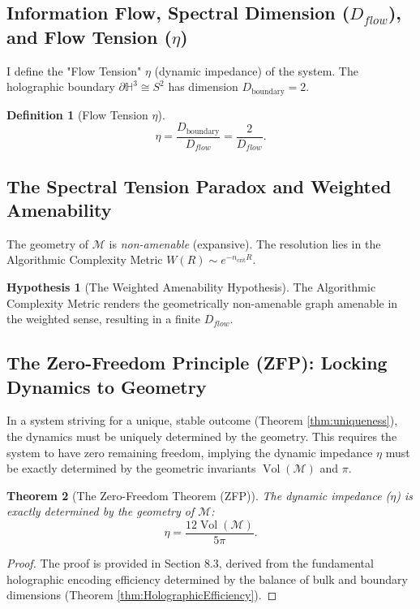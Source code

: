\documentclass[11pt, a4paper]{article}
\newtheorem{theorem}{Theorem}[section]
\theoremstyle{definition}
\newtheorem{definition}[theorem]{Definition}
\newtheorem{hypothesis}{Hypothesis}
\theoremstyle{definition}
\newcommand{\HH}{\mathbb{H}^3}
\newcommand{\M}{\mathcal{M}}
\newcommand{\Vol}{\operatorname{Vol}}
\newcommand{\Veight}{\Vol(\M)}
\newcommand{\ncrit}{n_{\mathrm{crit}}}
\newcommand{\Dboundary}{D_{\mathrm{boundary}}}
\begin{document}
\subsection{Information Flow, Spectral Dimension (\texorpdfstring{$D_{flow}$}{D flow}), and Flow Tension (\texorpdfstring{$\eta$}{eta})}

I define the "Flow Tension" $\eta$ (dynamic impedance) of the system. The holographic boundary $\partial \HH \cong S^2$ has dimension $\Dboundary=2$.
\begin{definition}[Flow Tension $\eta$]
\begin{equation}
    \eta = \frac{\Dboundary}{D_{flow}} = \frac{2}{D_{flow}}.
\end{equation}
\end{definition}

\subsection{The Spectral Tension Paradox and Weighted Amenability}

The geometry of $\M$ is \emph{non-amenable} (expansive). The resolution lies in the Algorithmic Complexity Metric $W(R) \sim e^{-\ncrit R}$.

\begin{hypothesis}[The Weighted Amenability Hypothesis]
The Algorithmic Complexity Metric renders the geometrically non-amenable graph amenable in the weighted sense, resulting in a finite $D_{flow}$.
\end{hypothesis}

\subsection{The Zero-Freedom Principle (ZFP): Locking Dynamics to Geometry}

In a system striving for a unique, stable outcome (Theorem \ref{thm:uniqueness}), the dynamics must be uniquely determined by the geometry. This requires the system to have zero remaining freedom, implying the dynamic impedance $\eta$ must be exactly determined by the geometric invariants $\Veight$ and $\pi$.

\begin{theorem}[The Zero-Freedom Theorem (ZFP)]\label{thm:ZFP}
The dynamic impedance ($\eta$) is exactly determined by the geometry of $\M$:
\begin{equation}
    \eta = \frac{12 \Veight}{5\pi}. \label{eq:ZFP}
\end{equation}
\end{theorem}
\begin{proof}
The proof is provided in Section 8.3, derived from the fundamental holographic encoding efficiency determined by the balance of bulk and boundary dimensions (Theorem \ref{thm:HolographicEfficiency}).
\end{proof}
\end{document}
